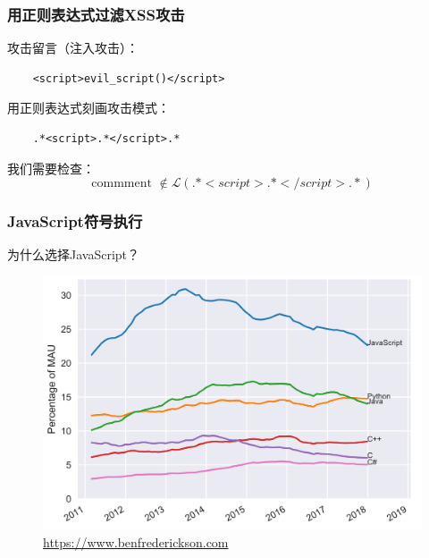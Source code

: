 \documentclass[landscape]{beamer}
\begin{document}
\begin{frame}[fragile,t]
  \frametitle{用正则表达式过滤XSS攻击}
  攻击留言（注入攻击）：
  \begin{lstlisting}
    <script>evil_script()</script>
  \end{lstlisting}
  \vspace{\baselineskip}
  用正则表达式刻画攻击模式：
  \begin{lstlisting}
    .*<script>.*</script>.*
  \end{lstlisting}
  \vspace{\baselineskip}
  我们需要检查：\\
  \begin{equation*}
    \text{commment } \not \in \mathcal{L}(.*<script>.*</script>.*)
  \end{equation*}
\end{frame}
\begin{frame}[fragile, t]
  \frametitle{JavaScript符号执行}
  为什么选择JavaScript？
  \begin{figure}
    \includegraphics[width=.9\linewidth]{javascript_motivation.jpg}
    \caption{\url{https://www.benfrederickson.com}}
  \end{figure}
\end{frame}
\end{document}
